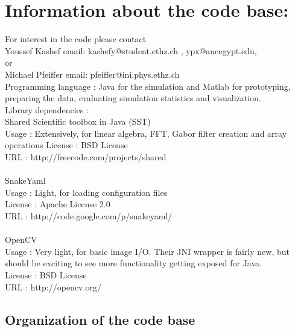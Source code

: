 \documentclass{report}
\begin{document}
\section{Information about the code base:} 

For interest in the code please contact \\
Youssef Kashef email: kashefy@student.ethz.ch , ypx@aucegypt.edu, \\
or \\
Michael Pfeiffer email: pfeiffer@ini.phys.ethz.ch \\

Programming language : Java for the simulation and Matlab for prototyping, preparing the data, evaluating simulation statistics and visualization.\\

Library dependencies : \\
	Shared Scientific toolbox in Java (SST) \cite{liu10}\\
		Usage : Extensively, for linear algebra, FFT, Gabor filter creation and array operations
		License : BSD License\\
		URL : http://freecode.com/projects/shared\\
	\\
	SnakeYaml\\
		Usage : Light, for loading configuration files\\
		License : Apache License 2.0\\
		URL : http://code.google.com/p/snakeyaml/\\
		\\
	OpenCV \cite{opencv_library}\\
		Usage : Very light, for basic image I/O. Their JNI wrapper is fairly new, but should be exciting to see more functionality getting exposed for Java.\\
		License : BSD License\\
		URL : http://opencv.org/\\
		
\subsection{Organization of the code base}
\end{document}
